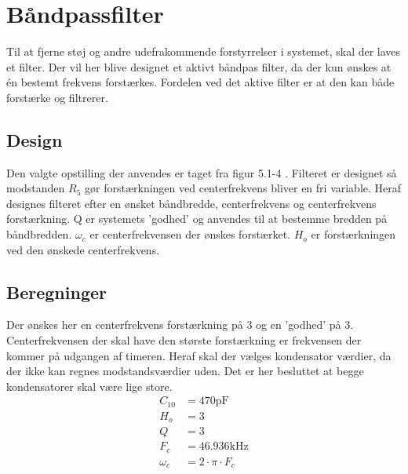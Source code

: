 \section{Båndpassfilter}\label{sec:filter}
Til at fjerne støj og andre udefrakommende forstyrrelser i systemet, skal der laves et filter.
Der vil her blive designet et aktivt båndpas filter, da der kun ønskes at én bestemt frekvens forstærkes.
Fordelen ved det aktive filter er at den kan både forstærke og filtrerer.

\subsection{Design}
Den valgte opstilling der anvendes er taget fra figur 5.1-4 \cite[side. 208]{Huelsman1993}.
Filteret er designet så modstanden $R_5$ gør forstærkningen ved centerfrekvens bliver en fri variable.
Heraf designes filteret efter en ønsket båndbredde, centerfrekvens og centerfrekvens forstærkning. Q er systemets 'godhed' og anvendes til at bestemme bredden på båndbredden. 
$\omega_c$ er centerfrekvensen der ønskes forstærket.
$H_o$ er forstærkningen ved den ønskede centerfrekvens.

\subsection{Beregninger}
Der ønskes her en centerfrekvens forstærkning på 3 og en 'godhed' på 3. 
Centerfrekvensen der skal have den største forstærkning er frekvensen der kommer på udgangen af timeren. 
Heraf skal der vælges kondensator værdier, da der ikke kan regnes modstandsværdier uden. 
Det er her besluttet at begge kondensatorer skal være lige store.
\begin{align}
	C_{10} & = 470 \si{\pico\farad} \nonumber \\
	H_o & = 3 \nonumber \\
	Q & = 3 \nonumber \\
	F_c & = 46.936 \si{\kilo\hertz} \nonumber \\
	\omega_c & = 2 \cdot \pi \cdot F_c
\end{align}

